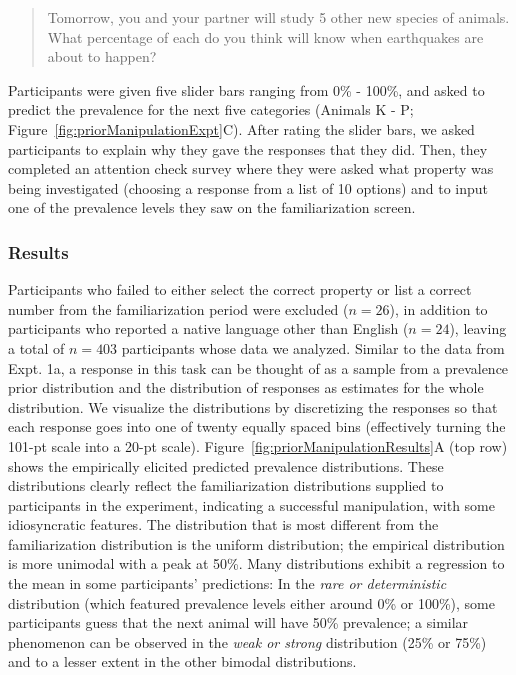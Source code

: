 \documentclass[floatsintext,doc]{apa6}
\begin{document}
\begin{quote}
Tomorrow, you and your partner will study 5 other new species of animals. What percentage of each do you think will know when earthquakes are about to happen?
\end{quote}

Participants were given five slider bars ranging from 0\% - 100\%, and asked to predict the prevalence for the next five categories (Animals K - P; Figure~\ref{fig:priorManipulationExpt}C).
After rating the slider bars, we asked participants to explain why they gave the responses that they did.
Then, they completed an attention check survey where they were asked what property was being investigated (choosing a response from a list of 10 options) and to input one of the prevalence levels they saw on the familiarization screen.

\hypertarget{results-1}{%
\subsubsection{Results}\label{results-1}}

Participants who failed to either select the correct property or list a correct number from the familiarization period were excluded ($n=26$), in addition to participants who reported a native language other than English ($n=24$), leaving a total of $n=403$ participants whose data we analyzed.
Similar to the data from Expt. 1a, a response in this task can be thought of as a sample from a prevalence prior distribution and the distribution of responses as estimates for the whole distribution.
We visualize the distributions by discretizing the responses so that each response goes into one of twenty equally spaced bins (effectively turning the 101-pt scale into a 20-pt scale).
Figure~\ref{fig:priorManipulationResults}A (top row) shows the empirically elicited predicted prevalence distributions.
These distributions clearly reflect the familiarization distributions supplied to participants in the experiment, indicating a successful manipulation, with some idiosyncratic features.
The distribution that is most different from the familiarization distribution is the uniform distribution; the empirical distribution is more unimodal with a peak at 50\%.
Many distributions exhibit a regression to the mean in some participants' predictions: In the \emph{rare or deterministic} distribution (which featured prevalence levels either around 0\% or 100\%), some participants guess that the next animal will have 50\% prevalence; a similar phenomenon can be observed in the \emph{weak or strong} distribution (25\% or 75\%) and to a lesser extent in the other bimodal distributions.
\end{document}
